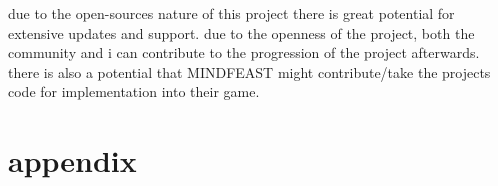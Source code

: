 due to the open-sources nature of this project there is great potential for extensive updates and support. due to the openness of the project, both the community and i can contribute to the progression of the project afterwards. there is also a potential that MINDFEAST might contribute/take the projects code for implementation into their game.

\printbibliography

\section{appendix}

